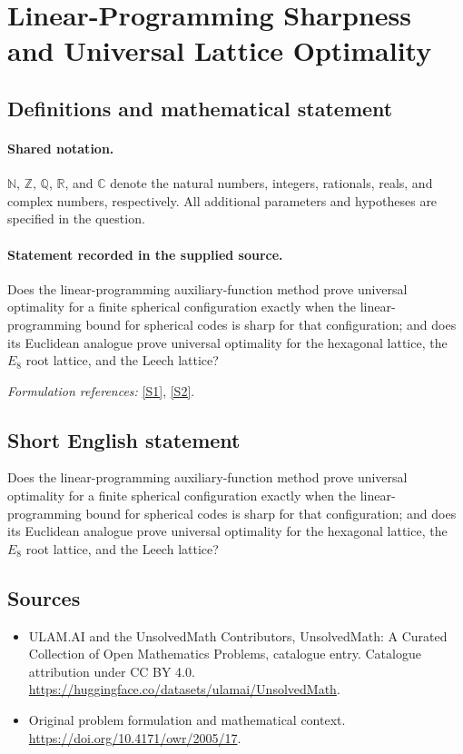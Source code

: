 \documentclass[11pt]{article}
\newcommand{\sref}[2]{\hyperlink{source:#1:#2}{[S#2]}}
\begin{document}
\section{Linear-Programming Sharpness and Universal Lattice Optimality}\label{statement}

\subsection{Definitions and mathematical statement}

\paragraph{Shared notation.}$\mathbb N$, $\mathbb Z$, $\mathbb Q$, $\mathbb R$, and $\mathbb C$ denote the natural numbers, integers, rationals, reals, and complex numbers, respectively. All additional parameters and hypotheses are specified in the question.


\paragraph{Statement recorded in the supplied source.}
Does the linear-programming auxiliary-function method prove universal optimality for a finite spherical configuration exactly when the linear-programming bound for spherical codes is sharp for that configuration; and does its Euclidean analogue prove universal optimality for the hexagonal lattice, the $E_8$ root lattice, and the Leech lattice?
\par\smallskip\textit{Formulation references:} \sref{statement}{1}, \sref{statement}{2}.
\subsection{Short English statement}
Does the linear-programming auxiliary-function method prove universal optimality for a finite spherical configuration exactly when the linear-programming bound for spherical codes is sharp for that configuration; and does its Euclidean analogue prove universal optimality for the hexagonal lattice, the $E_8$ root lattice, and the Leech lattice?
\subsection{Sources}
\begin{itemize}
\item[\hypertarget{source:statement:1}{S1}] ULAM.AI and the UnsolvedMath Contributors, UnsolvedMath: A Curated Collection of Open Mathematics Problems, catalogue entry. Catalogue attribution under CC BY 4.0.
\url{https://huggingface.co/datasets/ulamai/UnsolvedMath}.
\item[\hypertarget{source:statement:2}{S2}] Original problem formulation and mathematical context.
\url{https://doi.org/10.4171/owr/2005/17}.
\end{itemize}
\label{end:statement}
\end{document}
